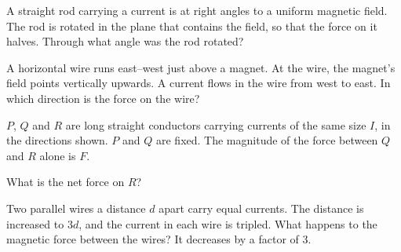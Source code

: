 \begin{quizq}{}
A straight rod carrying a current is at right angles to a uniform magnetic field. The rod is rotated in
the plane that contains the field, so that the force on it halves. Through what angle was the rod
rotated?
\end{quizq}

\begin{quizq}{}
A horizontal wire runs east--west just above a magnet. At the wire, the magnet's field points
vertically upwards. A current flows in the wire from west to east. In which direction is the force on
the wire?
\end{quizq}

\begin{quizq}{}
$P$, $Q$ and $R$ are long straight conductors carrying currents of the same size $I$, in the directions
shown. $P$ and $Q$ are fixed. The magnitude of the force between $Q$ and $R$ alone is $F$.
\begin{center}
\end{center}
What is the net force on $R$?
\end{quizq}

\begin{quizq}{}
Two parallel wires a distance $d$ apart carry equal currents. The distance is increased to $3d$, and the
current in each wire is tripled. What happens to the magnetic force between the wires?
  {It decreases by a factor of 3.}
\end{quizq}

